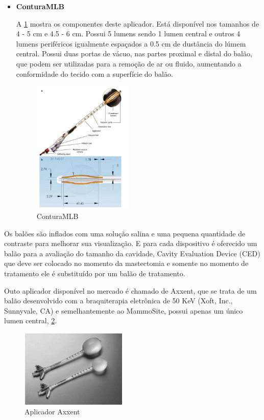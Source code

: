 \documentclass[11pt,a4paper]{article}
\begin{document}
\begin{itemize}
				
				\item \textbf{\textcolor{CarnationPink}{ConturaMLB}}
					
					A    \ref{img:conturaMLB} mostra os componentes deste aplicador. Está disponível nos tamanhos de 4 - 5 cm e 4.5 - 6 cm. Possui 5 lumens sendo 1 lumen central e outros 4 lumens periféricos igualmente espaçados a 0.5 cm de dustância do lúmem central. Possui duas portas de vácuo, nas partes proximal e distal do balão, que podem ser utilizadas para a remoção de ar ou fluido, aumentando a conformidade do tecido com a superfície do balão.
					
					\begin{figure}[h]
						\centering
						\includegraphics[width=0.45\textwidth]{Imagens/conturaMLB.JPG}
						\caption{ConturaMLB}
						\label{img:conturaMLB}
					\end{figure}
				\end{itemize}
			
			Os balões são inflados com uma solução salina e uma pequena quantidade de contraste para melhorar sua visualização. E para cada dispositivo é oferecido um balão para a avaliação do tamanho da cavidade, \textcolor{CarnationPink}{Cavity Evaluation Device (CED)} que deve ser colocado no momento da mastectomia e somente no momento de tratamento ele é substituído por um balão de tratamento.

			Outo aplicador disponível no mercado é chamado de \textcolor{CarnationPink}{Axxent}, que se trata de um balão desenvolvido com a braquiterapia eletrônica de 50 KeV (Xoft, Inc., Sunnyvale, CA) e semelhantemente ao MammoSite, possui apenas um único lumen central,    \ref{img:axxent}.

			\begin{figure}[h]
				\centering
				\includegraphics[width=0.45\textwidth]{Imagens/axxent.JPG}
				\caption{Aplicador Axxent}
				\label{img:axxent}
			\end{figure}

		








	\pagebreak
	
\end{document}
